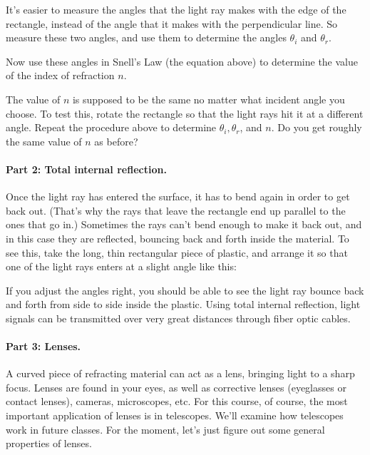 \centerline{\epsfxsize 3in}


It's easier to measure the angles that the light ray makes with
the edge of the rectangle, instead of the angle that it makes with
the perpendicular line.  So measure these two angles, and use them
to determine the angles $\theta_i$ and $\theta_r$.

\vskip 1.5in

Now use these angles in Snell's Law (the equation above) to determine
the value of the index of refraction $n$.

\vskip 1.5in

The value of $n$ is supposed to be the same no matter what incident angle
you choose.  To test this, rotate the rectangle so that the light
rays hit it at a different angle.  Repeat the procedure above to determine
$\theta_i,\theta_r$, and $n$.  Do you get roughly the same value of $n$ as
before?

\vskip 3in

\paragraph{Part 2: Total internal reflection.}
Once the light ray has entered the surface, it has to bend again
in order to get back out.  (That's why the rays that leave the rectangle
end up parallel to the ones that go in.)  Sometimes the rays can't bend
enough to make it back out, and in this case they are reflected, bouncing
back and forth inside the material.  To see this, take the long, thin
rectangular piece of plastic, and arrange it so that one of the light
rays enters at a slight angle like this:

\centerline{\epsfxsize 3in}



If you adjust the angles right, you should be able to see the light ray
bounce back and forth from side to side inside the plastic.  
Using total internal reflection, 
light signals can be transmitted over very great distances through
fiber optic cables.

\paragraph{Part 3: Lenses.}
A curved piece of refracting material can act as a lens, bringing
light to a sharp focus.  Lenses are found in your eyes, as well as
corrective lenses (eyeglasses or contact lenses), cameras,
microscopes, etc.  For this course, of course, the most important
application of lenses is in telescopes.  We'll examine how telescopes
work in future classes.  For the moment, let's just figure
out some general properties of lenses.

